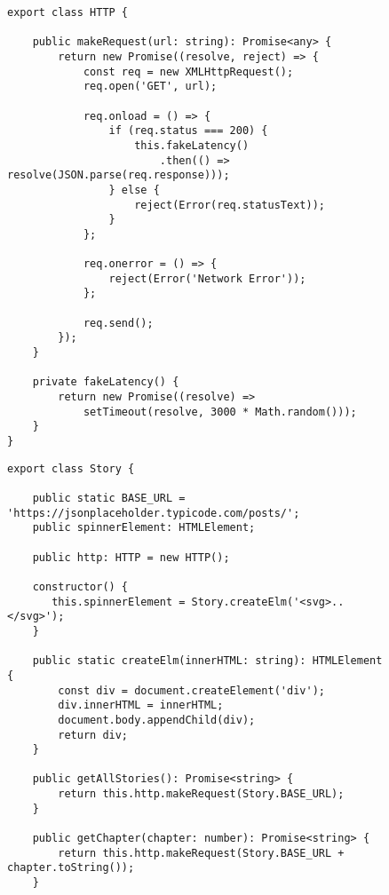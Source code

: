 \begin{figure}[H]
\begin{lstlisting}[basicstyle=\small]
export class HTTP {

    public makeRequest(url: string): Promise<any> {
        return new Promise((resolve, reject) => {
            const req = new XMLHttpRequest();
            req.open('GET', url);

            req.onload = () => {
                if (req.status === 200) {
                    this.fakeLatency()
                        .then(() => resolve(JSON.parse(req.response)));
                } else {
                    reject(Error(req.statusText));
                }
            };

            req.onerror = () => {
                reject(Error('Network Error'));
            };

            req.send();
        });
    }

    private fakeLatency() {
        return new Promise((resolve) =>
            setTimeout(resolve, 3000 * Math.random()));
    }
}
\end{lstlisting}
\end{figure}

\begin{figure}[H]
\begin{lstlisting}[basicstyle=\small]
export class Story {

    public static BASE_URL = 'https://jsonplaceholder.typicode.com/posts/';
    public spinnerElement: HTMLElement;

    public http: HTTP = new HTTP();

    constructor() {
       this.spinnerElement = Story.createElm('<svg>..</svg>');
    }

    public static createElm(innerHTML: string): HTMLElement {
        const div = document.createElement('div');
        div.innerHTML = innerHTML;
        document.body.appendChild(div);
        return div;
    }
    
    public getAllStories(): Promise<string> {
        return this.http.makeRequest(Story.BASE_URL);
    }

    public getChapter(chapter: number): Promise<string> {
        return this.http.makeRequest(Story.BASE_URL + chapter.toString());
    }
\end{lstlisting}
\end{figure}

